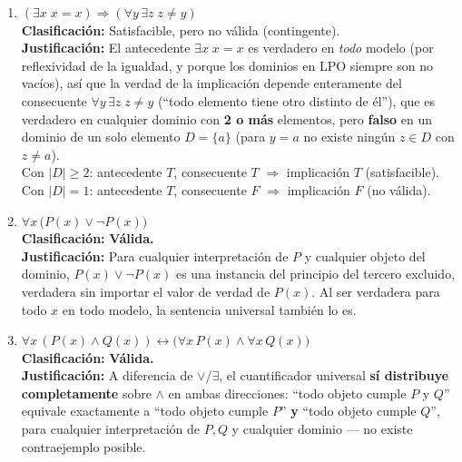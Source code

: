 \begin{enumerate}
    \item[4.] $(\exists x\; x{=}x) \Rightarrow (\forall y\, \exists z\; z\neq y)$\\
    \textbf{Clasificación:} Satisfacible, pero no válida (contingente).\\
    \textbf{Justificación:} El antecedente $\exists x\; x{=}x$ es verdadero en \emph{todo} modelo
    (por reflexividad de la igualdad, y porque los dominios en LPO siempre son no vacíos), así que la
    verdad de la implicación depende enteramente del consecuente $\forall y\,\exists z\; z\neq y$
    (``todo elemento tiene otro distinto de él''), que es verdadero en cualquier dominio con
    \textbf{2 o más} elementos, pero \textbf{falso} en un dominio de un solo elemento
    $D=\{a\}$ (para $y=a$ no existe ningún $z\in D$ con $z\neq a$).\\
    Con $|D|\geq 2$: antecedente $T$, consecuente $T$ $\Rightarrow$ implicación $T$ (satisfacible).\\
    Con $|D|=1$: antecedente $T$, consecuente $F$ $\Rightarrow$ implicación $F$ (no válida).

    \item[5.] $\forall x\, \big(P(x) \lor \neg P(x)\big)$\\
    \textbf{Clasificación:} \textbf{Válida.}\\
    \textbf{Justificación:} Para cualquier interpretación de $P$ y cualquier objeto del dominio,
    $P(x)\lor\neg P(x)$ es una instancia del principio del tercero excluido, verdadera sin importar
    el valor de verdad de $P(x)$. Al ser verdadera para todo $x$ en todo modelo, la sentencia
    universal también lo es.

    \item[6.] $\forall x\,(P(x)\land Q(x)) \leftrightarrow \big(\forall x\,P(x) \land \forall x\,Q(x)\big)$\\
    \textbf{Clasificación:} \textbf{Válida.}\\
    \textbf{Justificación:} A diferencia de $\lor$/$\exists$, el cuantificador universal
    \textbf{sí distribuye completamente} sobre $\land$ en ambas direcciones: ``todo objeto cumple $P$
    y $Q$'' equivale exactamente a ``todo objeto cumple $P$'' \textbf{y} ``todo objeto cumple $Q$'',
    para cualquier interpretación de $P,Q$ y cualquier dominio — no existe contraejemplo posible.


\end{enumerate}
